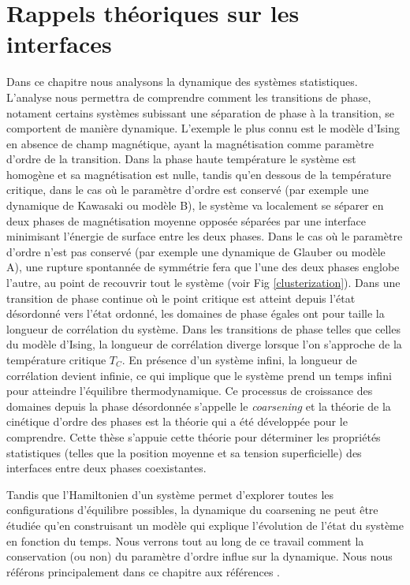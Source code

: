 \chapter{Rappels théoriques sur les interfaces}
 
Dans ce chapitre nous analysons la dynamique des systèmes statistiques. L'analyse nous permettra de comprendre comment les transitions de phase, notament certains systèmes subissant une séparation de phase à la transition, se comportent de manière dynamique. L'exemple le plus connu est le modèle d'Ising en absence de champ magnétique, ayant la magnétisation comme paramètre d'ordre de la transition. Dans la phase haute température le système est homogène et sa magnétisation est nulle, tandis qu'en dessous de la température critique, dans le cas où le paramètre d'ordre est conservé (par exemple une dynamique de Kawasaki ou modèle B), le système va localement se séparer en deux phases de magnétisation moyenne opposée séparées par une interface minimisant l'énergie de surface entre les deux phases. 
Dans le cas où le paramètre d'ordre n'est pas conservé (par exemple une dynamique de Glauber ou modèle A), une rupture spontannée de symmétrie fera que l'une des deux phases englobe l'autre, au point de recouvrir tout le système (voir Fig \ref{clusterization}). Dans une transition de phase continue où le point critique est atteint depuis l'état désordonné vers l'état ordonné, les domaines de phase égales ont pour taille la longueur de corrélation du système. Dans les transitions de phase telles que celles du modèle d'Ising, la longueur de corrélation diverge lorsque l'on s'approche de la température critique $T_C$. En présence d'un système infini, la longueur de corrélation devient infinie, ce qui implique que le système prend un temps infini pour atteindre l'équilibre thermodynamique. Ce processus de croissance des domaines depuis la phase désordonnée s'appelle le \textit{coarsening} et la théorie de la cinétique d'ordre des phases est la théorie qui a été développée pour le comprendre.
Cette thèse s'appuie cette théorie pour déterminer les propriétés statistiques (telles que la position moyenne et sa tension superficielle) des interfaces entre deux phases coexistantes.

Tandis que l'Hamiltonien d'un système permet d'explorer toutes les configurations d'équilibre possibles, la dynamique du coarsening ne peut être étudiée qu'en construisant un modèle qui explique l'évolution de l'état du système en fonction du temps. Nous verrons tout au long de ce travail comment la conservation (ou non) du paramètre d'ordre influe sur la dynamique. Nous nous référons principalement dans ce chapitre aux références \cite{hohenberg_theory_1977,bray_theory_1994,krapivsky_kinetic_2010,halpin-healy_kinetic_1995}.

